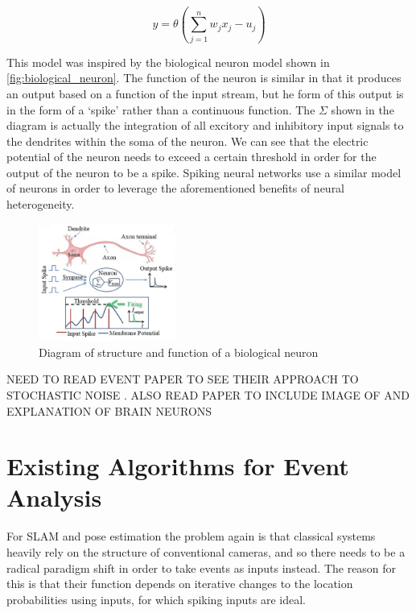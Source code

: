$$ y = \theta(\sum^n_{j=1}w_jx_j-u_j) $$

This model was inspired by the biological neuron model shown in \autoref{fig:biological_neuron}. The function of the neuron is similar in that it produces an output based on a function of the input stream, but he form of this output is in the form of a `spike' rather than a continuous function. The $ \Sigma $ shown in the diagram is actually the integration of all excitory and inhibitory input signals to the dendrites within the soma of the neuron. We can see that the electric potential of the neuron needs to exceed a certain threshold in order for the output of the neuron to be a spike. Spiking neural networks use a similar model of neurons in order to leverage the aforementioned benefits of neural heterogeneity.

\begin{figure}[htb]
      \centering
      \includegraphics[width=0.4\textwidth]{background/images/biological_neuron.png}
      \caption{Diagram of structure and function of a biological neuron \cite{BiologicalNeuronModel}}
      \label{fig:biological_neuron}
\end{figure}

\color{red} NEED TO READ EVENT PAPER TO SEE THEIR APPROACH TO STOCHASTIC NOISE \cite{EventBasedVisionASurvery}. ALSO READ PAPER\cite{NeuralHetroPromRobLearn} TO INCLUDE IMAGE OF AND EXPLANATION OF BRAIN NEURONS \color{black}

\section{Existing Algorithms for Event Analysis}

For SLAM and pose estimation the problem again is that classical systems heavily rely on the structure of conventional cameras, and so there needs to be a radical paradigm shift in order to take events as inputs instead. The reason for this is that their function depends on iterative changes to the location probabilities using inputs, for which spiking inputs are ideal.

